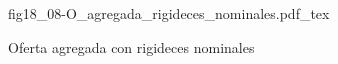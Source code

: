 \begin{figure}[h]
\centering
\def\svgwidth{0.5\textwidth}
{fig18_08-O_agregada_rigideces_nominales.pdf_tex}
\caption{Oferta agregada con rigideces nominales}
\label{fig18_08-O_agregada_rigideces_nominales}
\end{figure}